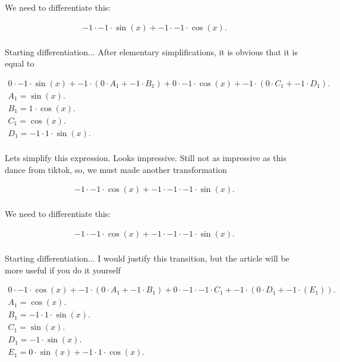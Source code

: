 \documentclass[12pt,a4paper]{extreport}
\begin{document}
We need to differentiate this:


\begin{multline}
-1 \cdot -1 \cdot \sin(x) + -1 \cdot -1 \cdot \cos(x).\\
\end{multline}


Starting differentiation... 
After elementary simplifications, it is obvious that it is equal to 

\begin{multline}
0 \cdot -1 \cdot \sin(x) + -1 \cdot (0 \cdot A_{1} + -1 \cdot B_{1}) + 0 \cdot -1 \cdot \cos(x) + -1 \cdot (0 \cdot C_{1} + -1 \cdot D_{1}).\\
A_{1} = \sin(x).\\
B_{1} = 1 \cdot \cos(x).\\
C_{1} = \cos(x).\\
D_{1} = -1 \cdot 1 \cdot \sin(x).\\
\end{multline}


Lets simplify this expression.
Looks impressive. Still not as impressive as this dance from tiktok\cite{Zolo}, so, we must made another transformation 

\begin{multline}
-1 \cdot -1 \cdot \cos(x) + -1 \cdot -1 \cdot -1 \cdot \sin(x).\\
\end{multline}


We need to differentiate this:


\begin{multline}
-1 \cdot -1 \cdot \cos(x) + -1 \cdot -1 \cdot -1 \cdot \sin(x).\\
\end{multline}


Starting differentiation... 
I would justify this transition, but the article will be more useful if you do it yourself 

\begin{multline}
0 \cdot -1 \cdot \cos(x) + -1 \cdot (0 \cdot A_{1} + -1 \cdot B_{1}) + 0 \cdot -1 \cdot -1 \cdot C_{1} + -1 \cdot (0 \cdot D_{1} + -1 \cdot (E_{1})).\\
A_{1} = \cos(x).\\
B_{1} = -1 \cdot 1 \cdot \sin(x).\\
C_{1} = \sin(x).\\
D_{1} = -1 \cdot \sin(x).\\
E_{1} = 0 \cdot \sin(x) + -1 \cdot 1 \cdot \cos(x).\\
\end{multline}
\end{document}
